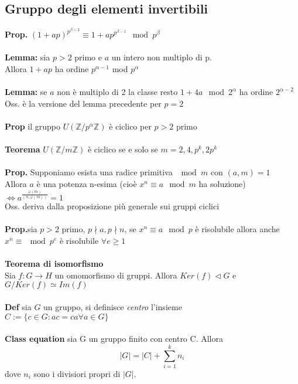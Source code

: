 \documentclass[10pt,a4paper]{article}
\begin{document}
\subsection{Gruppo degli elementi invertibili}
\textbf{Prop.} $(1+ap)^{p^{\beta -2}} \equiv 1+ap^{p^{\beta -1}} \mod p^\beta$\\\\ 
\textbf{Lemma:}  sia $p > 2$ primo e $a$ un intero non multiplo di p.\\
Allora $1+ap$ ha ordine $p^{\alpha-1}$ mod $p^\alpha$\\\\
\textbf{Lemma:} se $a$ non è multiplo di 2 la classe resto $1+4a \mod 2^\alpha$ ha ordine $2^{\alpha-2}$\\
Oss. è la versione del lemma precedente per $p=2$\\\\
\textbf{Prop} il gruppo $U(\mathbb{Z}/p^\alpha\mathbb{Z})$ è ciclico per $p>2$ primo\\\\
\textbf{Teorema} $U(\mathbb{Z}/m\mathbb{Z})$ è ciclico se e solo se $ m=2,4,p^k,2p^k $\\\\
\textbf{Prop.} Supponiamo esista una radice primitiva $\mod m$ con $(a,m)=1$\\
Allora $a$ è una potenza n-esima (cioè $x^n \equiv a \mod m$ ha soluzione) $\iff a^{\frac{\varphi(m)}{(n,\varphi(m))}}=1$\\
Oss. deriva dalla proposizione più generale sui gruppi ciclici\\\\
\textbf{Prop.}sia $p>2$ primo, $p \nmid a,p \nmid n$, se $x^n \equiv a \mod p$ è risolubile allora anche\\
$x^n \equiv \mod p^e$ è risolubile $\forall e \geq 1$\\\\
\textbf{Teorema di isomorfismo}\\
Sia $f: G \to H$ un omomorfismo di gruppi. Allora $Ker(f) \lhd G$ e $G/Ker(f) \simeq Im(f)$\\\\
\textbf{Def} sia $G$ un gruppo, si definisce \emph{centro} l'insieme\\
$ C := \{c \in G: ac= ca \forall a \in G\}$ \\\\
\textbf{Class equation} sia G un gruppo finito con centro C. Allora
$$|G| = |C| + \sum_{i=1}^k n_i$$
dove $n_i$ sono i divisiori propri di $|G|$.
\newpage
\end{document}
